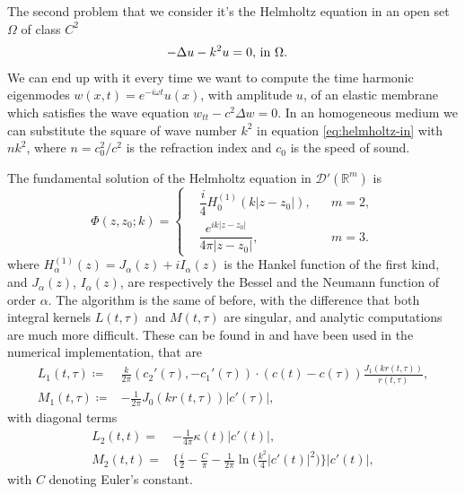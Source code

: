 \documentclass[10pt, a4paper]{article} %
\numberwithin{equation}{section}
\theoremstyle{definition}
\theoremstyle{plain}
\theoremstyle{plain}
\theoremstyle{plain}
\theoremstyle{plain}
\theoremstyle{plain}
\theoremstyle{plain}
\theoremstyle{plain}
\theoremstyle{plain}
\begin{document}
\par
The second problem that we consider it's the Helmholtz equation 
in an open set $\Omega$ of class $C^2$
\begin{eqnarray}
 -\Delta u - k^2 u= 0, & \textup{ in }\Omega.\label{eq:helmholtz-in}
\end{eqnarray}
We can end up with it every time we want to compute the time harmonic eigenmodes
$w(x,t)=e^{-i\omega t}u(x)$, with amplitude $u$, of an elastic membrane
which satisfies the wave equation $w_{tt} - c^2 \Delta w=0$. In an homogeneous medium
we can substitute the square of wave number $k^2$ in equation \eqref{eq:helmholtz-in}
with $n k^2$, where $n=c_0^2/c^2$ is the refraction index and $c_0$ is the speed of sound.
\par
The fundamental solution of the Helmholtz equation in $\mathcal{D}'(\mathbb{R}^m)$ is
\begin{equation}
\label{eq:definition-Phi-23-helm}
  \Phi(z,z_0;k)=
  \left\{
  \begin{aligned}
   &\dfrac{i}{4}H_0^{(1)}(k| z - z_0|), && m=2, \\
   &\dfrac{e^{ik| z - z_0|}}{4\pi| z  - z_0|}, && m=3.
  \end{aligned}
  \right.
\end{equation}
where $H_\alpha^{(1)}(z)=J_\alpha(z)+iI_\alpha(z)$ is the Hankel function of the first kind,
and $J_\alpha(z)$, $I_\alpha(z)$, are respectively the Bessel and the Neumann function
of order $\alpha$.
The algorithm is the same of before, with the difference that both integral kernels 
$L(t,\tau)$ and $M(t,\tau)$ are singular, and 
analytic computations are much more difficult. These can be found in \cite{colton-kress:book}
and have been used in the numerical implementation, that are
\begin{align}
 L_1(t,\tau)\coloneqq&\frac{k}{2\pi}(c_2'(\tau), -c_1'(\tau))\cdot (c(t) - c(\tau)) \frac{J_1(kr(t,\tau))}{r(t,\tau)}, \\
 M_1(t,\tau)\coloneqq&-\frac{1}{2\pi}J_0(kr(t,\tau))|c'(\tau)|,
\end{align}
with diagonal terms
\begin{align}
 L_2(t,t)=&-\frac{1}{4\pi}\kappa(t)|c'(t)|, \\
 M_2(t,t)=&\Big\{\frac{i}{2}-\frac{C}{\pi}
 -\frac{1}{2\pi}\ln\Big(\frac{k^2}{4}|c'(t)|^2\Big)\Big\}
 |c'(t)|,
\end{align}
with $C$ denoting Euler's constant.
\end{document}
